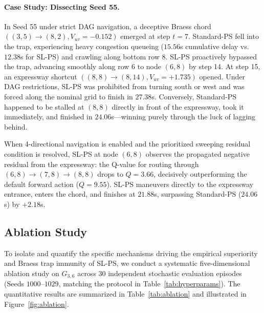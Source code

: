 \documentclass[11pt,a4paper]{article}
\begin{document}
\paragraph{Case Study: Dissecting Seed 55.}
In Seed 55 under strict DAG navigation, a deceptive Braess chord $((3, 5) \to (8, 2), V_{uv} = -0.152)$ emerged at step $t=7$. Standard-PS fell into the trap, experiencing heavy congestion queueing ($15.56$s cumulative delay vs. $12.38$s for SL-PS) and crawling along bottom row 8. SL-PS proactively bypassed the trap, advancing smoothly along row 6 to node $(6, 8)$ by step 14. At step 15, an expressway shortcut $((8, 8) \to (8, 14), V_{uv} = +1.735)$ opened. Under DAG restrictions, SL-PS was prohibited from turning south or west and was forced along the nominal grid to finish in $27.38$s. Conversely, Standard-PS happened to be stalled at $(8, 8)$ directly in front of the expressway, took it immediately, and finished in $24.06$s---winning purely through the luck of lagging behind.

When 4-directional navigation is enabled and the prioritized sweeping residual condition is resolved, SL-PS at node $(6, 8)$ observes the propagated negative residual from the expressway: the Q-value for routing through $(6, 8) \to (7, 8) \to (8, 8)$ drops to $Q = 3.66$, decisively outperforming the default forward action ($Q = 9.55$). SL-PS maneuvers directly to the expressway entrance, enters the chord, and finishes at $\mathbf{21.88}$s, surpassing Standard-PS ($24.06$s) by $\mathbf{+2.18}$s. 

\subsection{Ablation Study}
\label{subsec:ablation}

To isolate and quantify the specific mechanisms driving the empirical superiority and Braess trap immunity of SL-PS, we conduct a systematic five-dimensional ablation study on $G_{3,6}$ across 30 independent stochastic evaluation episodes (Seeds $1000$--$1029$, matching the protocol in Table~\ref{tab:hyperparams}). The quantitative results are summarized in Table~\ref{tab:ablation} and illustrated in Figure~\ref{fig:ablation}.
\end{document}
